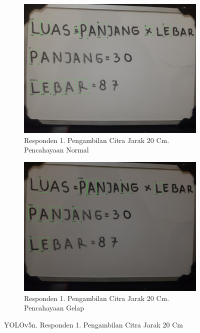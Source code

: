 \begin{figure}[H]
  \begin{subfigure}{.5\textwidth}
    \centering
    \captionsetup{width=.8\linewidth}
    \includegraphics[width=.8\linewidth]{gambar/yolov5n/responden1/dinda20cm00-result.jpg}
    \caption{Responden 1. Pengambilan Citra Jarak 20 Cm. Pencahayaan Normal}
    \label{fig:nr1tcitra20cm}
  \end{subfigure}%
  \begin{subfigure}{.5\textwidth}
    \centering
    \captionsetup{width=.8\linewidth}
    \includegraphics[width=.8\linewidth]{gambar/yolov5n/responden1/dinda20cm10-result.jpg}
    \caption{Responden 1. Pengambilan Citra Jarak 20 Cm. Pencahayaan Gelap}
    \label{fig:nr1gcitra20cm}
  \end{subfigure}
  \caption{YOLOv5n. Responden 1. Pengambilan Citra Jarak 20 Cm}
  \label{fig:nr1citra20cm}
\end{figure}

